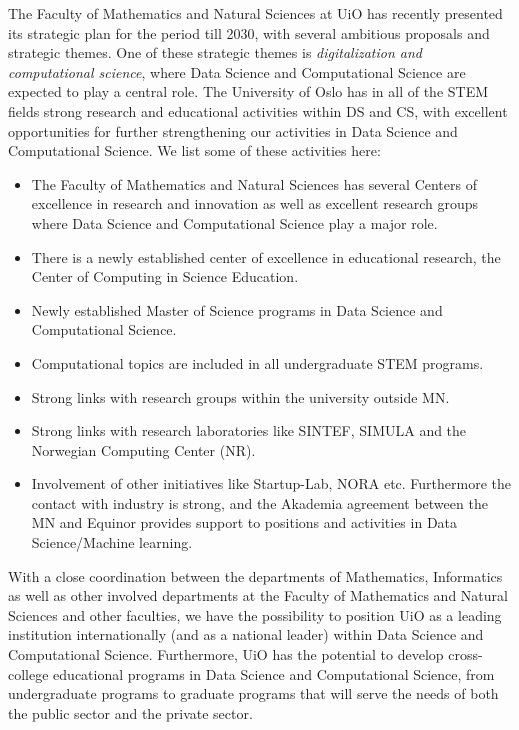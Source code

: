 \documentclass[a4paper,10pt]{article}
\begin{document}
The Faculty of Mathematics and Natural Sciences at UiO has recently presented its strategic plan for the period till 2030, with several ambitious proposals and strategic themes.  One of these strategic themes is \emph{digitalization and computational science}, where Data Science and Computational Science are expected to play a central role. 
The University of Oslo has in all of the STEM fields strong research and educational activities within DS and CS, with excellent opportunities for further strengthening our activities in Data Science and Computational Science. We list some of these activities here:
\begin{itemize}
\item The Faculty of Mathematics and Natural Sciences has several Centers of excellence in research and innovation as well as excellent research groups where Data Science and Computational Science play a major role.
\item There is a  newly established center of excellence in educational research, the Center of Computing in Science Education.
\item Newly established Master of Science programs in Data Science and Computational Science.
\item Computational topics are included in all undergraduate STEM programs.
\item Strong links with research groups within the university outside MN.
\item Strong links with research laboratories like SINTEF, SIMULA and the Norwegian Computing Center (NR).
\item Involvement of other initiatives like Startup-Lab, NORA etc. Furthermore the contact with industry is strong, and the Akademia agreement between the MN and Equinor provides support to positions and activities in Data Science/Machine learning.
\end{itemize}
With a close coordination between the departments of Mathematics,  Informatics as well as other involved departments at the Faculty of Mathematics and Natural Sciences and other faculties, we have the possibility to  position UiO as a leading institution internationally (and as a national leader) within Data Science and Computational Science. Furthermore, UiO has the potential to develop cross-college educational programs in Data Science and Computational Science, from undergraduate programs to graduate programs that will serve the needs of both the public sector and the private sector. 
\end{document}
